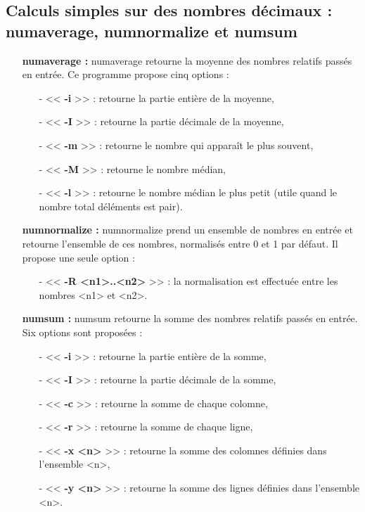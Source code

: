 \subsection{Calculs simples sur des nombres d\'ecimaux : numaverage, numnormalize et numsum}

\begin{itemize}
 \item[\textbullet] \textbf{numaverage :} numaverage retourne la moyenne des nombres relatifs pass\'es en entr\'ee.
Ce programme propose cinq options :
\begin{itemize}
  \item[-] << \textbf{-i} >> : retourne la partie enti\`ere de la moyenne,
  \item[-] << \textbf{-I} >> : retourne la partie d\'ecimale de la moyenne,
  \item[-] << \textbf{-m} >> : retourne le nombre qui appara\^it le plus souvent,
  \item[-] << \textbf{-M} >> : retourne le nombre m\'edian,
  \item[-] << \textbf{-l} >> : retourne le nombre m\'edian le plus petit (utile quand le nombre total d\'el\'ements est pair).
\newline
\end{itemize}
\item[\textbullet] \textbf{numnormalize :} numnormalize prend un ensemble de nombres en entr\'ee et retourne l'ensemble de ces nombres, 
normalis\'es entre 0 et 1 par d\'efaut. Il propose une seule option :
\begin{itemize}
 \item[-] << \textbf{-R <n1>..<n2>} >> : la normalisation est effectu\'ee entre les nombres <n1> et <n2>.
\newline
\end{itemize}
 \item[\textbullet] \textbf{numsum :} numsum retourne la somme des nombres relatifs pass\'es en entr\'ee.
Six options sont propos\'ees :
\begin{itemize}
 \item[-] << \textbf{-i} >> : retourne la partie enti\`ere de la somme,
 \item[-] << \textbf{-I} >> : retourne la partie d\'ecimale de la somme,
 \item[-] << \textbf{-c} >> : retourne la somme de chaque colomne,
 \item[-] << \textbf{-r} >> : retourne la somme de chaque ligne,
 \item[-] << \textbf{-x <n>} >> : retourne la somme des colomnes d\'efinies dans l'ensemble <n>,
 \item[-] << \textbf{-y <n>} >> : retourne la somme des lignes d\'efinies dans l'ensemble <n>.
\end{itemize}
\end{itemize}

